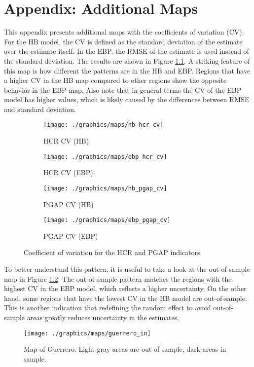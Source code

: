 \chapter{Appendix: Additional Maps}
\label{appendix:cv_maps}

This appendix presents additional maps with the coefficients of variation (CV).
For the HB model, the CV is defined as the standard deviation of the estimate over the estimate itself.
In the EBP, the RMSE of the estimate is used instead of the standard deviation.
The results are shown in Figure \ref{fig:cv_maps}.
A striking feature of this map is how different the patterns are in the HB and EBP.
Regions that have a higher CV in the HB map compared to other regions show the opposite behavior in the EBP map.
Also note that in general terms the CV of the EBP model has higher values, which is likely caused by the differences between RMSE and standard deviation.


\begin{figure}[h]
    \begin{subfigure}{0.49\linewidth}
        \centering
        \texttt{[image: ./graphics/maps/hb\_hcr\_cv]}
        \caption{HCR CV (HB)}
    \end{subfigure}
    \begin{subfigure}{0.49\linewidth}
        \centering
        \texttt{[image: ./graphics/maps/ebp\_hcr\_cv]}
        \caption{HCR CV (EBP)}
    \end{subfigure}

    \begin{subfigure}{0.49\linewidth}
        \centering
        \texttt{[image: ./graphics/maps/hb\_pgap\_cv]}
        \caption{PGAP CV (HB)}
    \end{subfigure}
    \begin{subfigure}{0.49\linewidth}
        \centering
        \texttt{[image: ./graphics/maps/ebp\_pgap\_cv]}
        \caption{PGAP CV (EBP)}
    \end{subfigure}
    \caption{Coefficient of variation for the HCR and PGAP indicators.}
    \label{fig:cv_maps}
\end{figure}

To better understand this pattern, it is useful to take a look at the out-of-sample map in Figure \ref{fig:guerrero_in}.
The out-of-sample pattern matches the regions with the highest CV in the EBP model, which reflects a higher uncertainty.
On the other hand, some regions that have the lowest CV in the HB model are out-of-sample.
This is another indication that redefining the random effect to avoid out-of-sample areas greatly reduces uncertainty in the estimates.


\begin{figure}
    \centering
    \texttt{[image: ./graphics/maps/guerrero\_in]}
       \caption[Map of Guerrero with in and out-of-sample areas]{Map of Guerrero. Light gray areas are out of sample, dark areas in sample.}
    \label{fig:guerrero_in}
\end{figure}